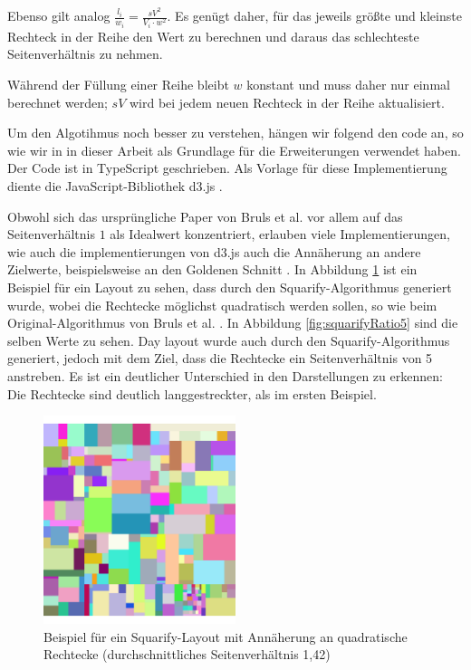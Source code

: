 Ebenso gilt analog $ \frac{l_i}{w_i} = \frac{sV^2}{V_i \cdot w^2} $. Es genügt daher, für das jeweils größte und kleinste Rechteck in der Reihe den Wert zu berechnen und daraus das schlechteste Seitenverhältnis zu nehmen.

Während der Füllung einer Reihe bleibt $w$ konstant und muss daher nur einmal berechnet werden; $sV$ wird bei jedem neuen Rechteck in der Reihe aktualisiert.

Um den Algotihmus noch besser zu verstehen, hängen wir folgend den code an, so wie wir in in dieser Arbeit als Grundlage für die Erweiterungen verwendet haben. Der Code ist in TypeScript geschrieben. Als Vorlage für diese Implementierung diente die JavaScript-Bibliothek d3.js \cite{d3_treemap_github}.



\smallskip

Obwohl sich das ursprüngliche Paper von Bruls et al. \cite{bruls2000squarified} vor allem auf das Seitenverhältnis $1$ als Idealwert konzentriert, erlauben viele Implementierungen, wie auch die implementierungen von d3.js \cite{d3_treemap_code} auch die Annäherung an andere Zielwerte, beispielsweise an den Goldenen Schnitt \cite{goldenRatio}. 
In Abbildung \ref{fig:squarifyRatio1} ist ein Beispiel für ein Layout zu sehen, dass durch den Squarify-Algorithmus generiert wurde, wobei die Rechtecke möglichst quadratisch werden sollen, so wie beim Original-Algorithmus von Bruls et al. \cite{bruls2000squarified}. In Abbildung \ref{fig:squarifyRatio5} sind die selben Werte zu sehen. Day layout wurde auch durch den Squarify-Algorithmus generiert, jedoch mit dem Ziel, dass die Rechtecke ein Seitenverhältnis von 5 anstreben. Es ist ein deutlicher Unterschied in den Darstellungen zu erkennen: Die Rechtecke sind deutlich langgestreckter, als im ersten Beispiel.

\begin{figure}[h]
    \centering
    \includegraphics[width=0.5\textwidth]{images/oneSquarify.png}
    \caption{Beispiel für ein Squarify-Layout mit Annäherung an quadratische Rechtecke (durchschnittliches Seitenverhältnis 1,42)}
    \label{fig:squarifyRatio1}
\end{figure}

